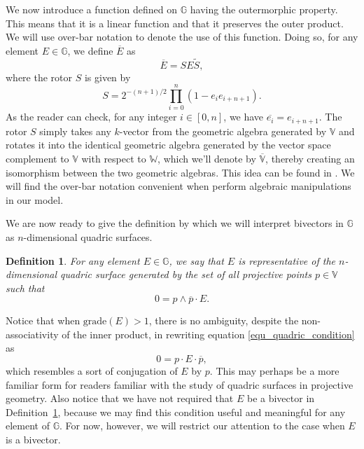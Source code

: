 \documentclass[12pt]{article}
\newcommand{\G}{\mathbb{G}}
\newcommand{\V}{\mathbb{V}}
\newcommand{\W}{\mathbb{W}}
\newtheorem{definition}{Definition}[section]
\numberwithin{equation}{section}
\begin{document}
We now introduce a function defined on $\G$ having the outermorphic property.
This means that it is a linear function and that it preserves the outer product.  We will
use over-bar notation to denote the use of this function.  Doing so, for any
element $E\in\G$, we define $\overline{E}$ as
\begin{equation}
\overline{E} = SE\tilde{S},
\end{equation}
where the rotor $S$ is given by
\begin{equation}
S = 2^{-(n+1)/2}\prod_{i=0}^n\left(1-e_ie_{i+n+1}\right).
\end{equation}
As the reader can check, for any integer $i\in[0,n]$, we have $\overline{e_i}=e_{i+n+1}$.
The rotor $S$ simply takes any $k$-vector from the geometric algebra generated
by $\V$ and rotates it into the identical geometric algebra generated by the vector
space complement to $\V$ with respect to $\W$, which we'll denote by $\overline{\V}$, thereby creating an isomorphism
between the two geometric algebras.  This idea can be found in \cite{DoranHestenes93}.
We will find the over-bar notation convenient when perform algebraic manipulations in our model.

We are now ready to give the definition by which we will interpret bivectors in $\G$
as $n$-dimensional quadric surfaces.
\begin{definition}\label{def_quadric}
For any element $E\in\G$, we say that $E$ is representative of the $n$-dimensional
quadric surface generated by the set of all projective points $p\in\V$ such that
\begin{equation}\label{equ_quadric_condition}
0 = p\wedge\overline{p}\cdot E.
\end{equation}
\end{definition}
Notice that when $\mbox{grade}(E)>1$, there is no ambiguity, despite the non-associativity
of the inner product, in rewriting equation
\eqref{equ_quadric_condition} as
\begin{equation}
0 = p\cdot E\cdot\overline{p},
\end{equation}
which resembles a sort of conjugation of $E$ by $p$.  This may perhaps be a more
familiar form for readers familiar with the study of quadric surfaces in projective geometry.
Also notice that we have not required that $E$ be a bivector in Definition~\ref{def_quadric},
because we may find this condition useful and meaningful for any element of $\G$.  For now,
however, we will restrict our attention to the case when $E$ is a bivector.
\end{document}
